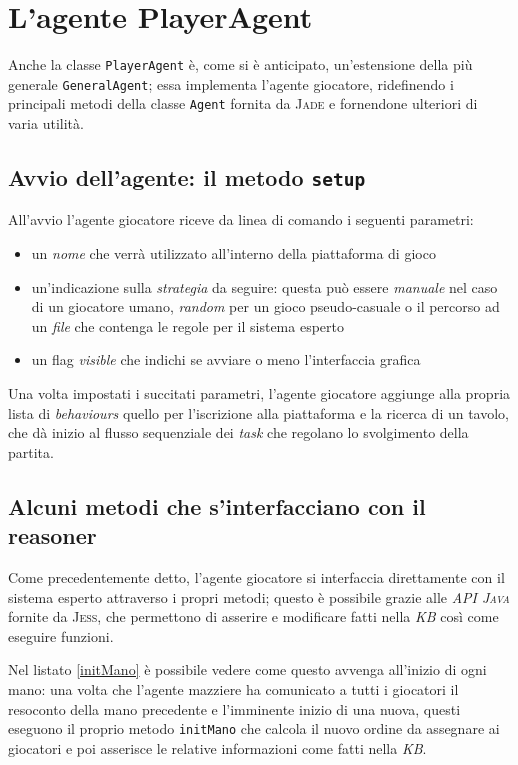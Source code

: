 \section{L'agente PlayerAgent}

Anche la classe \texttt{PlayerAgent} è, come si è anticipato, un'estensione della più generale \texttt{GeneralAgent}; essa implementa l'agente giocatore, ridefinendo i principali metodi della classe \texttt{Agent} fornita da \textsc{Jade} e fornendone ulteriori di varia utilità.

\subsection{Avvio dell'agente: il metodo \texttt{setup}}

All'avvio l'agente giocatore riceve da linea di comando i seguenti parametri:
\begin{itemize}
   \item un \emph{nome} che verrà utilizzato all'interno della piattaforma di gioco
   \item un'indicazione sulla \emph{strategia} da seguire: questa può essere \emph{manuale} nel caso di un giocatore umano, \emph{random} per un gioco pseudo-casuale o il percorso ad un \emph{file} che contenga le regole per il sistema esperto
   \item un flag \emph{visible} che indichi se avviare o meno l'interfaccia grafica
\end{itemize}

Una volta impostati i succitati parametri, l'agente giocatore aggiunge alla propria lista di \emph{behaviours} quello per l'iscrizione alla piattaforma e la ricerca di un tavolo, che dà inizio al flusso sequenziale dei \emph{task} che regolano lo svolgimento della partita.


\subsection{Alcuni metodi che s'interfacciano con il reasoner}

Come precedentemente detto, l'agente giocatore si interfaccia direttamente con il sistema esperto attraverso i propri metodi; questo è possibile grazie alle \emph{API \textsc{Java}} fornite da \textsc{Jess}, che permettono di asserire e modificare fatti nella \emph{KB} così come eseguire funzioni.

Nel listato \ref{initMano} è possibile vedere come questo avvenga all'inizio di ogni mano: una volta che l'agente mazziere ha comunicato a tutti i giocatori il resoconto della mano precedente e l'imminente inizio di una nuova, questi eseguono il proprio metodo \texttt{initMano} che calcola il nuovo ordine da assegnare ai giocatori e poi asserisce le relative informazioni come fatti nella \emph{KB}.


